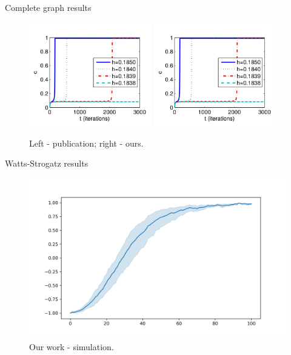 \documentclass[10pt]{beamer}
\begin{document}
\begin{frame}{Complete graph results}
	\begin{figure}
		\includegraphics[width=0.475\textwidth]{../resources/images/fig10-left.png}
		\hfill
		\includegraphics[width=0.475\textwidth]{../resources/images/fig10-left.png}
		\caption{Left - publication; right - ours.}
	\end{figure}
\end{frame}

\begin{frame}{Watts-Strogatz results}
	\begin{figure}
		\includegraphics[width=\textwidth]{../results/images/example.png}
		\caption{Our work - simulation.}
	\end{figure}
\end{frame}
\end{document}
